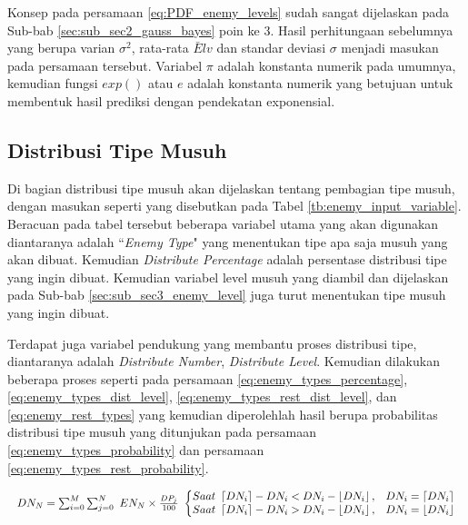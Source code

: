 Konsep pada persamaan \ref{eq:PDF_enemy_levels} sudah sangat dijelaskan pada Sub-bab \ref{sec:sub_sec2_gauss_bayes} poin ke 3. Hasil perhitungaan sebelumnya yang berupa varian $\sigma^2$, rata-rata $\bar{E}lv$ dan standar deviasi $\sigma$ menjadi masukan pada persamaan tersebut. Variabel $\pi$ adalah konstanta numerik pada umumnya, kemudian fungsi $exp()$ atau $e$ adalah konstanta numerik yang betujuan untuk membentuk hasil prediksi dengan pendekatan exponensial.
\vspace{1ex}

\subsection{Distribusi Tipe Musuh}
\label{sec:sub_sec3_enemy_type}
\vspace{1ex}

Di bagian distribusi tipe musuh akan dijelaskan tentang pembagian tipe musuh, dengan masukan seperti yang disebutkan pada Tabel \ref{tb:enemy_input_variable}. Beracuan pada tabel tersebut beberapa variabel utama yang akan digunakan diantaranya adalah ``\textit{Enemy Type}" yang menentukan tipe apa saja musuh yang akan dibuat. Kemudian \textit{Distribute Percentage} adalah persentase distribusi tipe yang ingin dibuat. Kemudian variabel level musuh yang diambil dan dijelaskan pada Sub-bab \ref{sec:sub_sec3_enemy_level} juga turut menentukan tipe musuh yang ingin dibuat.
\vspace{1ex}

Terdapat juga variabel pendukung yang membantu proses distribusi tipe, diantaranya adalah \textit{Distribute Number}, \textit{Distribute Level}. Kemudian dilakukan beberapa proses seperti pada persamaan \ref{eq:enemy_types_percentage}, \ref{eq:enemy_types_dist_level}, \ref{eq:enemy_types_rest_dist_level}, dan \ref{eq:enemy_rest_types} yang kemudian diperolehlah hasil berupa probabilitas distribusi tipe musuh yang ditunjukan pada persamaan \ref{eq:enemy_types_probability} dan persamaan \ref{eq:enemy_types_rest_probability}.
\vspace{1ex}

\begin{equation}\label{eq:enemy_types_percentage}
\begin{split}
	\resizebox{\columnwidth}{!}{%
		$DN_{N} = \sum_{i = 0}^{M} \sum_{j = 0}^{N}\ EN_{N} \times \frac{DP_{j}}{100}\ 
		\left\{\begin{matrix} 
		Saat\ \left \lceil DN_{i} \right \rceil - DN_{i} < DN_{i} - \left \lfloor DN_{i} \right \rfloor, & DN_{i} = \left \lceil DN_{i} \right \rceil \\ 
		Saat\ \left \lceil DN_{i} \right \rceil - DN_{i} > DN_{i} - \left \lfloor DN_{i} \right \rfloor, & DN_{i} = \left \lfloor DN_{i} \right \rfloor
		\end{matrix}\right.$%
	}
\end{split}
\end{equation}

